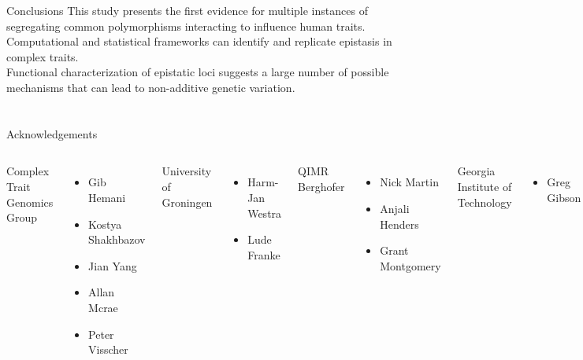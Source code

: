 \documentclass{beamer}
\begin{document}
\begin{frame}{Conclusions}
This study presents the first evidence for multiple instances of segregating common polymorphisms interacting to influence human traits. \\
\vspace{0.4cm}
Computational and statistical frameworks can identify and replicate epistasis in complex traits. \\
\vspace{0.4cm}
Functional characterization of epistatic loci suggests a large number of possible mechanisms that can lead to non-additive genetic variation.
\end{frame}

\section*{}
\begin{frame}{Acknowledgements}
\begin{columns}
{\tiny
Complex Trait Genomics Group
\begin{itemize}
\item Gib Hemani
\item Kostya Shakhbazov
\item Jian Yang
\item Allan Mcrae
\item Peter Visscher
\end{itemize}
University of Groningen
\begin{itemize}
\item Harm-Jan Westra
\item Lude Franke
\end{itemize}
}
{\tiny
QIMR Berghofer
\begin{itemize}
\item Nick Martin
\item Anjali Henders
\item Grant Montgomery
\end{itemize}
Georgia Institute of Technology
\begin{itemize}
\item Greg Gibson
\end{itemize}
University of Tartu
\begin{itemize}
\item Andres Metspalu
\item Tonu Esko
\end{itemize}
Visit us at www.complextraitgenomics.com
}
\end{columns}
\end{frame}
\end{document}
